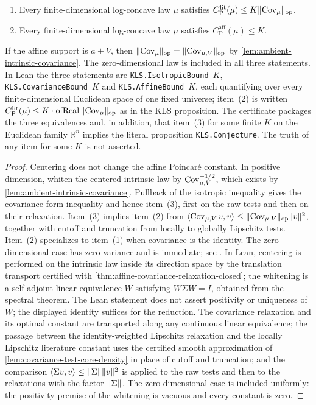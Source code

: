 \begin{theorem}
\begin{enumerate}
    \item Every finite-dimensional log-concave law $\mu$ satisfies
          $C_{\mathrm P}^{\mathrm{lit}}(\mu)\le K\lVert\operatorname{Cov}_\mu\rVert_{\mathrm{op}}$.
    \item Every finite-dimensional log-concave law $\mu$ satisfies
          $C_{\mathrm P}^{\mathrm{aff}}(\mu)\le K$.
  \end{enumerate}
  If the affine support is $a+V$, then
  $\lVert\operatorname{Cov}_\mu\rVert_{\mathrm{op}}=\lVert\operatorname{Cov}_{\mu,V}\rVert_{\mathrm{op}}$ by
  \cref{lem:ambient-intrinsic-covariance}.  The zero-dimensional law is included in all three
  statements.
  In Lean the three statements are \texttt{KLS.IsotropicBound}~$K$,
  \texttt{KLS.CovarianceBound}~$K$ and \texttt{KLS.AffineBound}~$K$, each quantifying over every
  finite-dimensional Euclidean space of one fixed universe; item~(2) is written
  $C_{\mathrm P}^{\mathrm{lit}}(\mu)\le K\cdot\mathrm{ofReal}\,\lVert\operatorname{Cov}_\mu\rVert_{\mathrm{op}}$ as in the KLS proposition.  The
  certificate packages the three equivalences and, in addition, that item~(3) for some finite $K$
  on the Euclidean family $\mathbb R^n$ implies the literal proposition \texttt{KLS.Conjecture}.
  The truth of any item for some $K$ is not asserted.
\end{theorem}
\begin{proof}
  \leanok
  Centering does not change the affine Poincar\'e constant.  In positive dimension, whiten the
  centered intrinsic law by $\operatorname{Cov}_{\mu,V}^{-1/2}$, which exists by
  \cref{lem:ambient-intrinsic-covariance}.  Pullback of the isotropic inequality gives the
  covariance-form inequality and hence item~(3), first on the raw tests and then on their
  relaxation.  Item~(3) implies item~(2) from
  $\langle\operatorname{Cov}_{\mu,V}v,v\rangle\le\lVert\operatorname{Cov}_{\mu,V}\rVert_{\mathrm{op}}\lVert v\rVert^2$, together with cutoff and
  truncation from locally to globally Lipschitz tests.  Item~(2) specializes to item~(1) when
  covariance is the identity.  The zero-dimensional case has zero variance and is immediate; see
  \cite{KannanLovaszSimonovits1995,LeeVempala2018}.
  In Lean, centering is performed on the intrinsic law inside its direction space by the
  translation transport certified with \cref{thm:affine-covariance-relaxation-closed}; the
  whitening is a self-adjoint linear equivalence $W$ satisfying $W\Sigma W=I$, obtained from the
  spectral theorem.  The Lean statement does not assert positivity or uniqueness of $W$; the
  displayed identity suffices for the reduction.  The covariance relaxation and its optimal constant are transported
  along any continuous linear equivalence; the passage between the identity-weighted Lipschitz
  relaxation and the locally Lipschitz literature constant uses the certified smooth approximation
  of \cref{lem:covariance-test-core-density} in place of cutoff and truncation; and the comparison
  $\langle\Sigma v,v\rangle\le\lVert\Sigma\rVert\lVert v\rVert^2$ is applied to the raw tests and then to the
  relaxations with the factor $\lVert\Sigma\rVert$.  The zero-dimensional case is included uniformly: the
  positivity premise of the whitening is vacuous and every constant is zero.
\end{proof}

